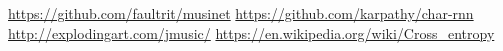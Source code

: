 \documentclass{article}
\begin{document}
\begin{thebibliography}{}
 \url{https://github.com/faultrit/musinet}
 \url{https://github.com/karpathy/char-rnn}
 \url{http://explodingart.com/jmusic/}
 \url{https://en.wikipedia.org/wiki/Cross_entropy}
\end{thebibliography}
\end{document}

